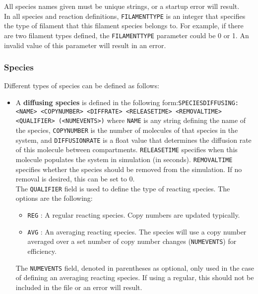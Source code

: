 \documentclass[11pt, oneside]{article}   	%
\begin{document}
\noindent All species names given must be unique strings, or a startup error will result.\\

\noindent In all species and reaction definitions, \texttt{FILAMENTTYPE} is an integer that specifies the type of filament that this filament species belongs to. For example, if there are two filament types defined, the \texttt{FILAMENTTYPE} parameter could be 0 or 1. An invalid value of this parameter will result in an error.

\subsubsection{Species}
Different types of species can be defined as follows:

\begin{itemize}
\item 
A \textbf{diffusing species} is defined in the following form:\newline\newline \texttt{SPECIESDIFFUSING: <NAME> <COPYNUMBER> <DIFFRATE> <RELEASETIME> <REMOVALTIME> <QUALIFIER> (<NUMEVENTS>)} \newline\newline where \texttt{NAME} is any string defining the name of the species, \texttt{COPYNUMBER} is the number of molecules of that species in the system, and \texttt{DIFFUSIONRATE} is a float value that determines the diffusion rate of this molecule between compartments. \texttt{RELEASETIME} specifies when this molecule populates the system in simulation (in seconds). \texttt{REMOVALTIME} specifies whether the species should be removed from the simulation. If no removal is desired, this can be set to 0.\\

The \texttt{QUALIFIER} field is used to define the type of reacting species. The options are the following:
\begin{itemize}
\item \texttt{REG} : A regular reacting species. Copy numbers are updated typically.
\item \texttt{AVG} : An averaging reacting species. The species will use a copy number averaged over a set number of copy number changes (\texttt{NUMEVENTS}) for efficiency.
\end{itemize}
The \texttt{NUMEVENTS} field, denoted in parentheses as optional, only used in the case of defining an averaging reacting species. If using a regular, this should not be included in the file or an error will result.


\end{itemize}
\end{document}
